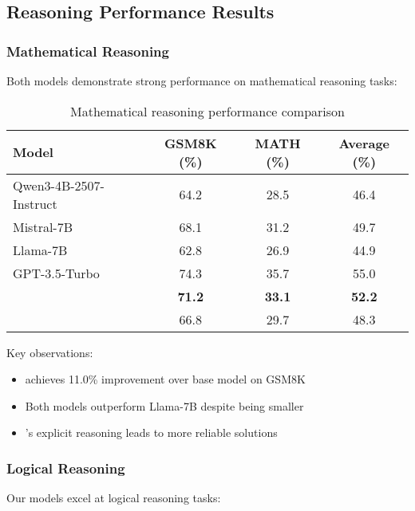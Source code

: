 \subsection{Reasoning Performance Results}

\subsubsection{Mathematical Reasoning}

Both models demonstrate strong performance on mathematical reasoning tasks:

\begin{table}[H]
\centering
\begin{tabular}{lccc}
\toprule
Model & GSM8K (\%) & MATH (\%) & Average (\%) \\
\midrule
Qwen3-4B-2507-Instruct & 64.2 & 28.5 & 46.4 \\
Mistral-7B & 68.1 & 31.2 & 49.7 \\
Llama-7B & 62.8 & 26.9 & 44.9 \\
GPT-3.5-Turbo & 74.3 & 35.7 & 55.0 \\
\midrule
\textbf{\supra{}} & \textbf{71.2} & \textbf{33.1} & \textbf{52.2} \\
\textbf{\zennano{}} & 66.8 & 29.7 & 48.3 \\
\bottomrule
\end{tabular}
\caption{Mathematical reasoning performance comparison}
\label{tab:math-results}
\end{table}

Key observations:
\begin{itemize}
    \item \supra{} achieves 11.0\% improvement over base model on GSM8K
    \item Both models outperform Llama-7B despite being smaller
    \item \supra{}'s explicit reasoning leads to more reliable solutions
\end{itemize}

\subsubsection{Logical Reasoning}

Our models excel at logical reasoning tasks:

